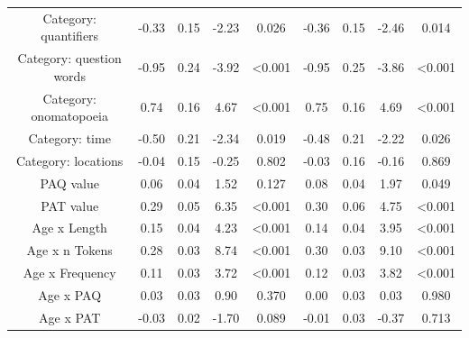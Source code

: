 \documentclass[
]{article}
\begin{document}
\begin{longtable}[t]{ccccccccc}
Category: quantifiers & -0.33 & 0.15 & -2.23 & 0.026 & -0.36 & 0.15 & -2.46 & 0.014\\
Category: question words & -0.95 & 0.24 & -3.92 & <0.001 & -0.95 & 0.25 & -3.86 & <0.001\\
Category: onomatopoeia & 0.74 & 0.16 & 4.67 & <0.001 & 0.75 & 0.16 & 4.69 & <0.001\\
\addlinespace
Category: time & -0.50 & 0.21 & -2.34 & 0.019 & -0.48 & 0.21 & -2.22 & 0.026\\
Category: locations & -0.04 & 0.15 & -0.25 & 0.802 & -0.03 & 0.16 & -0.16 & 0.869\\
PAQ value & 0.06 & 0.04 & 1.52 & 0.127 & 0.08 & 0.04 & 1.97 & 0.049\\
PAT value & 0.29 & 0.05 & 6.35 & <0.001 & 0.30 & 0.06 & 4.75 & <0.001\\
Age x Length & 0.15 & 0.04 & 4.23 & <0.001 & 0.14 & 0.04 & 3.95 & <0.001\\
\addlinespace
Age x n Tokens & 0.28 & 0.03 & 8.74 & <0.001 & 0.30 & 0.03 & 9.10 & <0.001\\
Age x Frequency & 0.11 & 0.03 & 3.72 & <0.001 & 0.12 & 0.03 & 3.82 & <0.001\\
Age x PAQ & 0.03 & 0.03 & 0.90 & 0.370 & 0.00 & 0.03 & 0.03 & 0.980\\
Age x PAT & -0.03 & 0.02 & -1.70 & 0.089 & -0.01 & 0.03 & -0.37 & 0.713\\
\bottomrule
\end{longtable}
\end{document}
